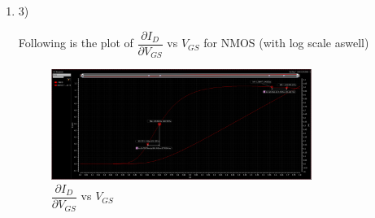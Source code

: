 \documentclass[journal, onecolumn]{IEEEtran} %
\begin{document}
\begin{enumerate}[2.]

	\pagebreak

	\item3) {

		Following is the plot of $\dfrac{\partial{I_{D}}}{\partial{V_{GS}}}$ vs $V_{GS}$ for NMOS (with log scale aswell)
		\begin{figure}[htpb]
			\centering
			\includegraphics[width=0.8\textwidth]{2-3nmos}
			\caption{$\dfrac{\partial{I_{D}}}{\partial{V_{GS}}}$ vs $V_{GS}$}
			\label{fig:2-3nmos}
		\end{figure}

}
\end{enumerate}
\end{document}
